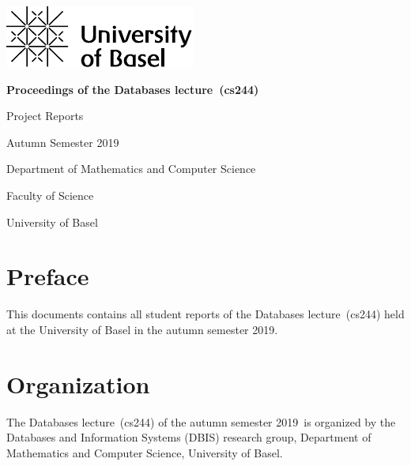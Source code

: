 \documentclass[runningheads,a4paper]{llncs}
\newenvironment{produceProceedings}{}{}
\newcommand{\coursename}{Databases lecture}
\newcommand{\courseacronym}{cs244}
\newcommand{\semester}{autumn semester 2019}
\newcommand{\Semester}{Autumn Semester 2019}
\newcommand{\proceedingsSubtitle}{Project Reports}
\begin{document}
	
\begin{produceProceedings}
	
	\begin{titlepage}
		\includegraphics{UniBas_Logo_EN_Schwarz_RGB_65}
		
		\vspace{80pt}
		
		\centering
		
		\begin{spacing}{2.8}
		{\Huge {} \bfseries Proceedings of the \coursename\ (\courseacronym)}
		\end{spacing}
		
		\vspace{25pt}
		
		{\large \proceedingsSubtitle}
		
		\vspace{50pt}
		
		{\large \Semester}
		
		\vspace{50pt}
		
		{\large	Department of Mathematics and Computer Science}
		
		\vspace{5pt}
		
		{\large Faculty of Science}
		
		\vspace{25pt}
		
		{\large	University of Basel}
	\end{titlepage}
	
	
	\pagestyle{headings}
	\chapter*{Preface}
	This documents contains all student reports of the \coursename\ (\courseacronym) held at the University of Basel in the \semester.
	\chapter*{Organization}
	The \coursename\ (\courseacronym) of the \semester\ is organized by the Databases and Information Systems (DBIS) research group, Department of Mathematics and Computer Science, University of Basel.

\end{produceProceedings}
\end{document}

